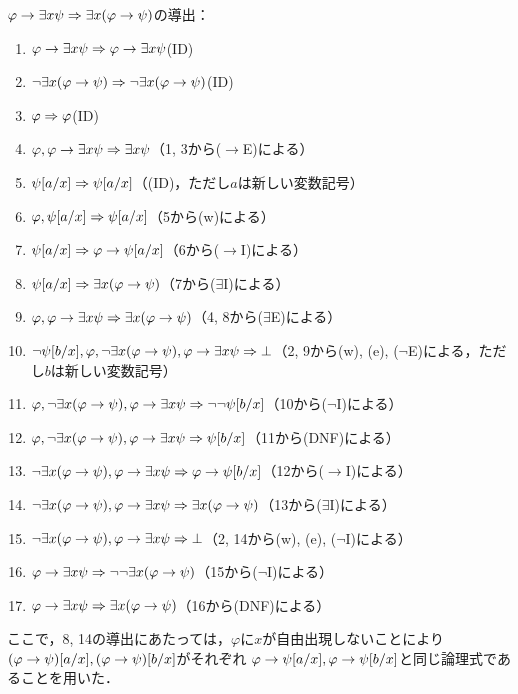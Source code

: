 \(\varphi \to \exists x \psi \sequent \exists x \paren{\varphi \to \psi}\)の導出：
\begin{enumerate}
	\item \(\varphi \to \exists x \psi \Rightarrow \varphi \to \exists x \psi\)\quad (ID)
	\item \(\lnot \exists x \paren{\varphi \to \psi} \sequent \lnot \exists x \paren{\varphi \to \psi}\)\quad (ID)
	\item \(\varphi \Rightarrow \varphi\)\quad (ID)
	\item \(\varphi, \varphi \to \exists x \psi \Rightarrow \exists x \psi\)\quad （1, 3から(\(\to\)E)による）
	\item \(\subst{\psi}{a/x} \sequent \subst{\psi}{a/x}\)\quad （(ID)，ただし\(a\)は新しい変数記号）
	\item \(\varphi, \subst{\psi}{a/x} \sequent \subst{\psi}{a/x}\)\quad （5から(w)による）
	\item \(\subst{\psi}{a/x} \sequent \varphi \to \subst{\psi}{a/x}\)\quad （6から(\(\to\)I)による）
	\item \(\subst{\psi}{a/x} \sequent \exists x \paren{\varphi \to \psi}\)\quad （7から(\(\exists\)I)による）
	\item \(\varphi, \varphi \to \exists x \psi \sequent \exists x \paren{\varphi \to \psi}\)\quad （4, 8から(\(\exists\)E)による）
	\item \(\lnot \subst{\psi}{b/x}, \varphi, \lnot \exists x \paren{\varphi \to \psi}, \varphi \to \exists x \psi \sequent \bot\)\quad （2, 9から(w), (e), (\(\lnot\)E)による，ただし\(b\)は新しい変数記号）
	\item \(\varphi, \lnot \exists x \paren{\varphi \to \psi}, \varphi \to \exists x \psi \sequent \lnot \lnot \subst{\psi}{b/x}\)\quad （10から(\(\lnot\)I)による）
	\item \(\varphi, \lnot \exists x \paren{\varphi \to \psi}, \varphi \to \exists x \psi \sequent \subst{\psi}{b/x}\)\quad （11から(DNF)による）
	\item \(\lnot \exists x \paren{\varphi \to \psi}, \varphi \to \exists x \psi \sequent \varphi \to \subst{\psi}{b/x}\)\quad （12から(\(\to\)I)による）
	\item \(\lnot \exists x \paren{\varphi \to \psi}, \varphi \to \exists x \psi \sequent \exists x \paren{\varphi \to \psi}\)\quad （13から(\(\exists\)I)による）
	\item \(\lnot \exists x \paren{\varphi \to \psi}, \varphi \to \exists x \psi \sequent \bot\)\quad （2, 14から(w), (e), (\(\lnot\)I)による）
	\item \(\varphi \to \exists x \psi \sequent \lnot \lnot \exists x \paren{\varphi \to \psi}\)\quad （15から(\(\lnot\)I)による）
	\item \(\varphi \to \exists x \psi \sequent \exists x \paren{\varphi \to \psi}\)\quad （16から(DNF)による）
\end{enumerate}
ここで，8, 14の導出にあたっては，\(\varphi\)に\(x\)が自由出現しないことにより
\(\subst{\paren{\varphi \to \psi}}{a/x}, \subst{\paren{\varphi \to \psi}}{b/x}\)がそれぞれ
\(\varphi \to \subst{\psi}{a/x}, \varphi \to \subst{\psi}{b/x}\)と同じ論理式であることを用いた．

